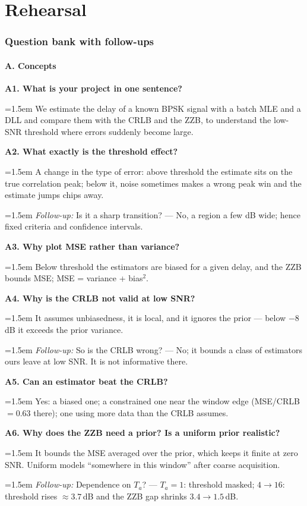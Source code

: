 \documentclass[11pt,a4paper]{article}
\begin{document}
\part{Rehearsal}
\section{Question bank with follow-ups}\label{sec:qa}
\newcommand{\Q}[1]{\par\medskip\noindent\textbf{#1}\par}
\newcommand{\A}[1]{\noindent\hangindent=1.5em\hangafter=0 #1\par}
\newcommand{\F}[1]{\noindent\hangindent=1.5em\hangafter=0 \textcolor{black!65}{\textit{Follow-up:} #1}\par}

\subsection*{A. Concepts}
\Q{A1. What is your project in one sentence?}
\A{We estimate the delay of a known BPSK signal with a batch MLE and a DLL and compare them with the CRLB and the ZZB, to understand the low-SNR threshold where errors suddenly become large.}
\Q{A2. What exactly is the threshold effect?}
\A{A change in the type of error: above threshold the estimate sits on the true correlation peak; below it, noise sometimes makes a wrong peak win and the estimate jumps chips away.}
\F{Is it a sharp transition? --- No, a region a few dB wide; hence fixed criteria and confidence intervals.}
\Q{A3. Why plot MSE rather than variance?}
\A{Below threshold the estimators are biased for a given delay, and the ZZB bounds MSE; MSE = variance + bias$^2$.}
\Q{A4. Why is the CRLB not valid at low SNR?}
\A{It assumes unbiasedness, it is local, and it ignores the prior --- below $-8$\,dB it exceeds the prior variance.}
\F{So is the CRLB wrong? --- No; it bounds a class of estimators ours leave at low SNR. It is not informative there.}
\Q{A5. Can an estimator beat the CRLB?}
\A{Yes: a biased one; a constrained one near the window edge (MSE/CRLB $=0.63$ there); one using more data than the CRLB assumes.}
\Q{A6. Why does the ZZB need a prior? Is a uniform prior realistic?}
\A{It bounds the MSE averaged over the prior, which keeps it finite at zero SNR. Uniform models ``somewhere in this window'' after coarse acquisition.}
\F{Dependence on $T_a$? --- $T_a=1$: threshold masked; $4\to16$: threshold rises $\approx3.7$\,dB and the ZZB gap shrinks $3.4\to1.5$\,dB.}
\end{document}
